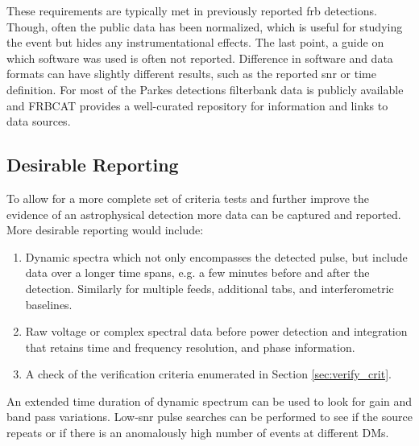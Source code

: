 \documentclass[a4paper,fleqn,usenatbib]{mnras}
\begin{document}

These requirements are typically met in previously reported \gls{frb}
detections. Though, often the public data has been normalized, which is useful
for studying the event but hides any instrumentational effects.  The last point,
a guide on which software was used is often not reported.  Difference in
software and data formats can have slightly different results, such as the
reported \gls{snr} or time definition. For most of the Parkes detections
filterbank data is publicly available and FRBCAT \citep{2016PASA...33...45P}
provides a well-curated repository for information and links to data sources.

\subsection{Desirable Reporting}

To allow for a more complete set of criteria tests and further improve the
evidence of an astrophysical detection more data can be captured and reported.
More desirable reporting would include:

\begin{enumerate}
    \item Dynamic spectra which not only encompasses the detected pulse, but
    include data over a longer time spans, e.g. a few minutes before and after
    the detection. Similarly for multiple feeds, additional \glspl{tab}, and
    interferometric baselines.
    \item Raw voltage or complex spectral data before power detection and
    integration that retains time and frequency resolution, and phase
    information.
    \item A check of the verification criteria enumerated in Section
    \ref{sec:verify_crit}.
\end{enumerate}

An extended time duration of dynamic spectrum can be used to look for gain and
band pass variations. Low-\gls{snr} pulse searches can be performed to see if
the source repeats or if there is an anomalously high number of events at
different DMs.
\end{document}
